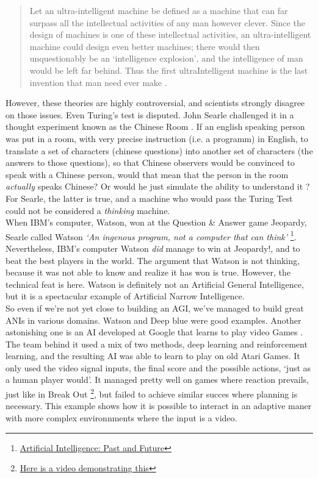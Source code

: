 \documentclass[12pt]{article}
\begin{document}
\smallskip

\begin{quotation}
   Let an ultra-intelligent machine be defined as a machine that can far surpass
   all the intellectual activities of any man however clever. Since the design
   of machines is one of these intellectual activities, an ultra-intelligent
   machine could design even better machines; there would then unquestionably be
   an \lq intelligence explosion\rq , and the intelligence of man would be left
   far behind. Thus the first ultraIntelligent machine is the last invention
   that man need ever make \cite{Good}.
\end{quotation}

However, these theories are highly controversial, and scientists strongly
disagree on those issues. Even Turing's test is disputed. John Searle challenged
it in a thought experiment known as the Chinese Room \cite{ChineseRoom}. If an
english speaking person was put in a room, with very precise instruction (i.e. a
programm) in English, to translate a set of characters (chinese questions) into
another set of characters (the answers to those questions), so that Chinese
observers would be convinced to speak with a Chinese person, would that mean
that the person in the room {\em actually} speaks Chinese? Or would he just
simulate the ability to understand it ? For Searle, the latter is true, and a
machine who would pass the Turing Test could not be considered a {\em thinking}
machine. \\

When IBM's computer, Watson, won at the Question \& Answer game Jeopardy, Searle
called Watson \textit{\lq  An ingenous program, not a computer that can
think\rq} \footnote{
\href{http://cacm.acm.org/magazines/2012/1/144824-artificial-intelligence-past-and-future/fulltext}
{Artificial Intelligence: Past and Future}}. Nevertheless, IBM's computer Watson
{\em did} manage to win at Jeopardy!, and to beat the best players in the world.
The argument that Watson is not thinking, because it was not able to know and
realize it has won is true. However, the technical feat is here. Watson is
definitely not an Artificial General Intelligence, but it is a spectacular
example of Artificial Narrow Intelligence. \\

So even if we're not yet close to building an \gls{AGI}, we've managed to build
great \gls{ANI}s in various domains. Watson and Deep blue were good examples.
Another astonishing one is an AI developed at Google that learns to play video
Games \cite{Atari}. The team behind it used a mix of two methods, deep learning
and reinforcement learning, and the resulting AI was able to learn to play on
old Atari Games. It only used the video signal inputs, the final score and the
possible actions, \lq just as a human player would\rq. It managed pretty well on
games where reaction prevails, just like in Break Out
\footnote{\href{https://www.youtube.com/watch?v=cjpEIotvwFY} {Here is a video
demonstrating this}}, but failed to achieve similar succes where planning is
necessary. This example shows how it is possible to interact in an adaptive
maner with more complex environnments where the input is a video. \\
\end{document}
